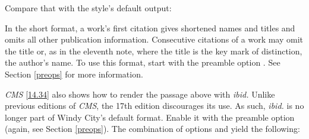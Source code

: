 \documentclass[11pt,letterpaper,oneside]{article}
\begin{document}
Compare that with the style's default output:

\begin{citeonly}
\item \cite[3]{morrison2004a}
\item \cite[18]{morrison2004a}
\item \cite[18]{morrison2004a}
\item \cite[24--26]{morrison2004a}
\item \cite[401-2]{morrison2004b}
\item \cite[433]{morrison2004b}
\item \cite[37--38]{diaz2008}
\item \cite[403]{morrison2004b}
\item \cite[152]{diaz2008}
\item \cite[201-2]{diaz2008}
\item \cites[240]{morrison2004b}[32]{morrison2004a}
\item \cite[33]{morrison2004a}
\end{citeonly}

\noindent In the short format, a work's first citation gives shortened
names and titles and omits all other publication information.
Consecutive citations of a work may omit the title or, as in the
eleventh note, where the title is the key mark of distinction, the
author's name. To use this format, start \biblatex with the preamble
option . See Section \ref{preops} for more information.

\textit{CMS} \ref{14.34} also shows how to render the passage above
with \textit{ibid.} Unlike previous editions of \textit{CMS}, the 17th
edition discourages its use. As such, \textit{ibid.} is no longer part
of Windy City's default format. Enable it with the preamble option
 (again, see Section \ref{preops}). The combination of
options  and  yield the following:
\end{document}
